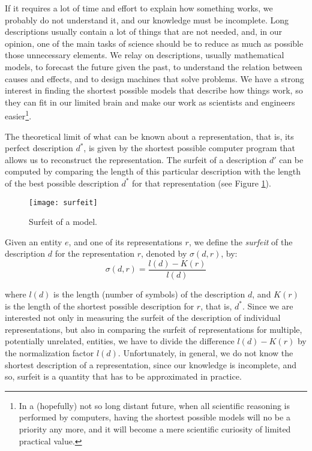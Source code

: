 If it requires a lot of time and effort to explain how something works, we probably do not understand it, and our knowledge must be incomplete. Long descriptions usually contain a lot of things that are not needed, and, in our opinion, one of the main tasks of science should be to reduce as much as possible those unnecessary elements. We relay on descriptions, usually mathematical models, to forecast the future given the past, to understand the relation between causes and effects, and to design machines that solve problems. We have a strong interest in finding the shortest possible models that describe how things work, so they can fit in our limited brain and make our work as scientists and engineers easier\footnote{In a (hopefully) not so long distant future, when all scientific reasoning is performed by computers, having the shortest possible models will no be a priority any more, and it will become a mere scientific curiosity of limited practical value.}.

The theoretical limit of what can be known about a representation, that is, its perfect description $d^\ast$, is given by the shortest possible computer program that allows us to reconstruct the representation. The surfeit of a description $d'$ can be computed by comparing the length of this particular description with the length of the best possible description $d^\ast$ for that representation (see Figure \ref{fig:intro-surfeit}).

\begin{figure}[h]
\centering\texttt{[image: surfeit]}
\caption{\label{fig:intro-surfeit}Surfeit of a model.}
\end{figure}

Given an entity $e$, and one of its representations $r$, we define the \emph{surfeit} of the description $d$ for the representation $r$, denoted by $\sigma(d, r)$, by:
\[
\sigma\left(d, r\right) = \frac{l \left(d\right) - K(r)}{l \left(d\right)}
\]

where $l \left(d\right)$ is the length (number of symbols) of the description $d$, and $K(r)$ is the length of the shortest possible description for $r$, that is, $d^\ast$. Since we are interested not only in measuring the surfeit of the description of individual representations, but also in comparing the surfeit of representations for multiple, potentially unrelated, entities, we have to divide the difference $l \left(d\right) - K(r)$ by the normalization factor $l \left(d\right)$. Unfortunately, in general, we do not know the shortest description of a representation, since our knowledge is incomplete, and so, surfeit is a quantity that has to be approximated in practice.

